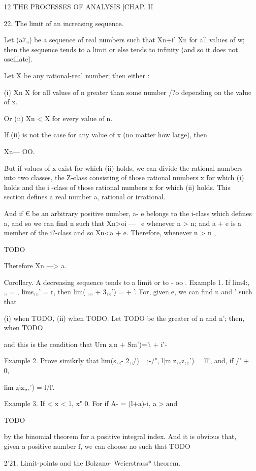 12 THE PROCESSES OF ANALYSIS [CHAP. II

22. The limit of an increasing sequence.

Let (a7„) be a sequence of real numbers such that Xn+i' Xn for all
values of w; then the sequence tends to a limit or else tends to
infinity (and so it does not oscillate).

Let X be any rational-real number; then either :

(i) Xn X for all values of n greater than some number /?o depending on
the value of x.

Or (ii) Xn < X for every value of n.

If (ii) is not the case for any value of x (no matter how large), then

Xn— OO.

But if values of x exist for which (ii) holds, we can divide the
rational numbers into two classes, the Z-class consisting of those
rational numbers x for which (i) holds and the i -class of those
rational numbers x for which (ii) holds. This section defines a real
number a, rational or irrational.

And if € be an arbitrary positive number, a- e belongs to the i-class
which defines a, and so we can find n such that Xn>oi — \ e whenever n
> n; and a + e is a member of the i?-class and so Xn<a + e.
Therefore, whenever n > n ,

TODO

Therefore Xn —> a.

Corollary. A decreasing sequence tends to a limit or to - oo . Example
1. If lim4:,„ = , lims,„' = r, then lim( ,„ + 3,„') = + '. For, given
e, we can find n and ' such that

(i) when TODO, (ii) when TODO. Let TODO be the greater of n and n';
then, when TODO

and this is the condition that Urn z,n + Sm')='i + i'-

Example 2. Prove simikrly that lim(s,„- 2,,/) =;-/", l[m z,„z,„') =
ll', and, if /' + 0,

lim zjz„,') = l/l'.

Example 3. If < x < 1, x" 0. For if A- = (l+a)-i, a > and

TODO

by the binomial theorem for a positive integral index. And it is
obvious that, given a positive number f, we can choose no such that
TODO

2'21. Limit-points and the Bolzano- Weierstrass* theorem.

